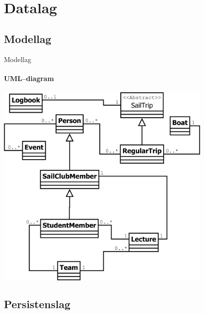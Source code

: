 \section{Datalag}

\subsection{Modellag}

\begin{frame}{Modellag}
  \framesubtitle{UML--diagram}
  \begin{center}
    \includegraphics[width=0.8\textwidth,height=0.8\textheight,keepaspectratio]{images/UML.png}
  \end{center}
\end{frame}


\subsection{Persistenslag}

